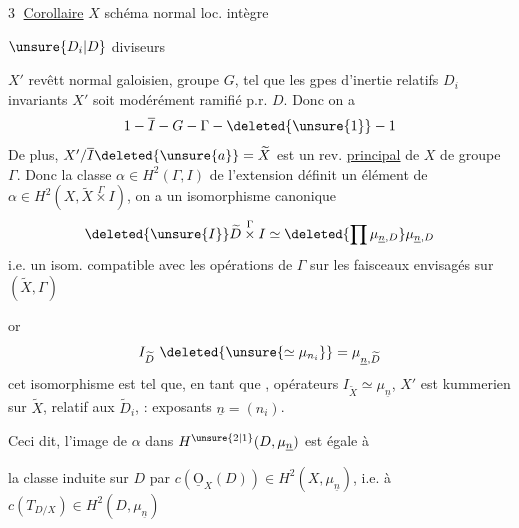 \textcircled{3} \uline{Corollaire} $X$ schéma normal  loc. intègre

$\unsure{D_i|D}$ diviseurs   

$X'$ revêtt  normal galoisien, groupe $G$, tel que
les gpes d'inertie  relatifs  $D_i$ 
invariants  
$X'$ soit modérément ramifié p.r.   $D$. Donc on a 
\[
1\mathbin{-}\overline I\mathbin{-}G\mathbin{-}\Gamma\mathbin{-}\deleted{\unsure{1}}\mathbin{-}1
\]
 De plus,
$X'/\overline I\deleted{\unsure{a}}=\widetilde X$ est  un rev. \uline{principal} de $X$ de
groupe $\Gamma$. Donc la classe $\alpha\in H^2(\Gamma,I)$ de l'extension
définit un élément de $\alpha\in H^2(X,\widetilde X\overset{\Gamma}{\times} I)$,  on a un isomorphisme canonique
\[
\deleted{\unsure{I}}\widetilde D\overset{\Gamma}{\times}I\simeq\deleted{\prod\mu_{\underline n,D}}\mu_{\underline n,D}
\]
i.e. un isom. compatible avec les opérations de
$\Gamma$  sur les faisceaux envisagés sur $(\widetilde X,\Gamma)$

or
\[
I_{\widetilde D}\ \deleted{\unsure{\simeq\mu_{n_i}}}=\mu_{\underline n,\widetilde D}
\]
 cet isomorphisme est tel que, en tant
que , opérateurs $I_{\widetilde X}\simeq\mu_{\underline n}$, $X'$ est 
kummerien sur $\widetilde X$, relatif aux $\widetilde D_i$, : exposants $\underline n=(n_i)$.

Ceci dit, l'image de $\alpha$ dans $H^{\unsure{2|1}}(D,\mu_{\underline n})$ est égale à


la classe induite sur $D$ par $c(\underline{\mathrm O}_X(D))\in H^2(X,\mu_{\underline n})$, i.e.
à $c(T_{D/X})\in H^2(D,\mu_{\underline n})$ 
